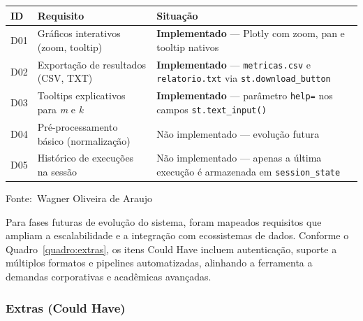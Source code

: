 \documentclass[12pt,a4paper]{article}
\newcommand{\oautor}{Wagner Oliveira de Araujo}
\begin{document}
\begin{quadro}[ht]
\centering
\small
\caption{Requisitos desejáveis do sistema (Should Have)}
\label{quadro:desejaveis}
\begin{threeparttable}
\begin{tabularx}{\textwidth}{|l|X|X|} \hline
\textbf{ID} & \textbf{Requisito} & \textbf{Situação} \\ \hline
D01 & Gráficos interativos (zoom, tooltip) & \textbf{Implementado} --- Plotly com zoom, pan e tooltip nativos \\ \hline
D02 & Exportação de resultados (CSV, TXT) & \textbf{Implementado} --- \texttt{metricas.csv} e \texttt{relatorio.txt} via \texttt{st.download\_button} \\ \hline
D03 & Tooltips explicativos para \textit{m} e \textit{k} & \textbf{Implementado} --- parâmetro \texttt{help=} nos campos \texttt{st.text\_input()} \\ \hline
D04 & Pré-processamento básico (normalização) & Não implementado --- evolução futura \\ \hline
D05 & Histórico de execuções na sessão & Não implementado --- apenas a última execução é armazenada em \texttt{session\_state} \\ \hline
\end{tabularx}
\begin{tablenotes}[flushleft]
\footnotesize
\item Fonte:~\oautor
\end{tablenotes}
\end{threeparttable}
\end{quadro}

Para fases futuras de evolução do sistema, foram mapeados requisitos que ampliam a escalabilidade e a integração com ecossistemas de dados. Conforme o Quadro~\ref{quadro:extras}, os itens Could Have incluem autenticação, suporte a múltiplos formatos e pipelines automatizadas, alinhando a ferramenta a demandas corporativas e acadêmicas avançadas.

\subsubsection{Extras (Could Have)}
\end{document}
